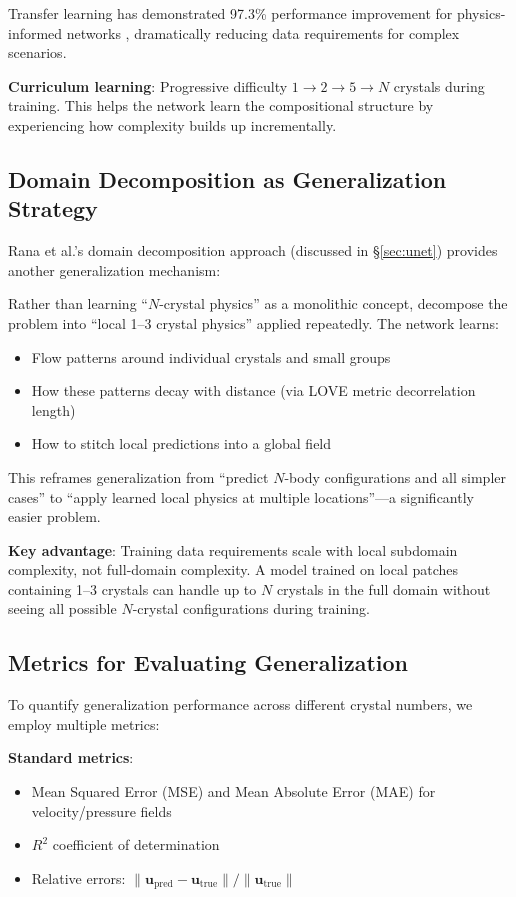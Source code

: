 Transfer learning has demonstrated 97.3\% performance improvement for physics-informed networks \cite{pellegrin2022transfer}, dramatically reducing data requirements for complex scenarios.

\textbf{Curriculum learning}: Progressive difficulty $1 \rightarrow 2 \rightarrow 5 \rightarrow N$ crystals during training. This helps the network learn the compositional structure by experiencing how complexity builds up incrementally.

\subsection{Domain Decomposition as Generalization Strategy}

Rana et al.'s \cite{rana2024scalable_cnn} domain decomposition approach (discussed in \S\ref{sec:unet}) provides another generalization mechanism:

Rather than learning ``$N$-crystal physics'' as a monolithic concept, decompose the problem into ``local 1--3 crystal physics'' applied repeatedly. The network learns:
\begin{itemize}
    \item Flow patterns around individual crystals and small groups
    \item How these patterns decay with distance (via LOVE metric decorrelation length)
    \item How to stitch local predictions into a global field
\end{itemize}

This reframes generalization from ``predict $N$-body configurations and all simpler cases'' to ``apply learned local physics at multiple locations''---a significantly easier problem.

\textbf{Key advantage}: Training data requirements scale with local subdomain complexity, not full-domain complexity. A model trained on local patches containing 1--3 crystals can handle up to $N$ crystals in the full domain without seeing all possible $N$-crystal configurations during training.

\subsection{Metrics for Evaluating Generalization}

To quantify generalization performance across different crystal numbers, we employ multiple metrics:

\textbf{Standard metrics}:
\begin{itemize}
    \item Mean Squared Error (MSE) and Mean Absolute Error (MAE) for velocity/pressure fields
    \item $R^2$ coefficient of determination
    \item Relative errors: $\|\mathbf{u}_{\text{pred}} - \mathbf{u}_{\text{true}}\| / \|\mathbf{u}_{\text{true}}\|$
\end{itemize}

